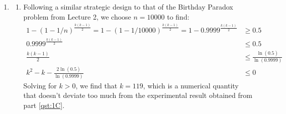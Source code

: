 \documentclass{article}
\begin{document}
\begin{enumerate}[leftmargin={*}, font={\bf}, label={\arabic*.}, ref={\arabic*}]
\begin{enumerate}[label={(\Alph*)}, ref={\theenumi(\Alph*)}]
      \item \label{qst:2C}
        For fixed values of $n = 1000$ and $m = 500$ the expected number of trials is
        $7649.81$.

      \item \label{qst:2D}
        Please refer to \autoref{lst:coupon-collector} for implementation details. A run
        with $n = 1000$ and $m = 500$ took approximately $0.0048$ seconds.
        \begin{figure}[H]
          \centering
        \end{figure}
    \end{enumerate}

  \item \label{qst:3}
    \begin{enumerate}[label={(\Alph*)}]
      \item \label{qst:3A}
        Following a similar strategic design to that of the Birthday Paradox problem from
        Lecture 2, we choose $n = 10000$ to find:
        \begin{align*}
          1 - (1 - 1/n)^{\frac{k (k - 1)}{2}} = 1 - (1 - 1/10000)^{\frac{k (k - 1)}{2}}
          = 1 - 0.9999^{\frac{k (k - 1)}{2}} &\geq 0.5 \\
          0.9999^{\frac{k (k - 1)}{2}} &\leq 0.5 \\
          \frac{k (k - 1)}{2} &\leq \frac{\ln{(0.5)}}{\ln{(0.9999)}} \\
          k^2 - k - \frac{2 \ln{(0.5)}}{\ln(0.9999)} &\leq 0
        \end{align*}
        Solving for $k > 0$, we find that $k = 119$, which is a numerical quantity that doesn't
        deviate too much from the experimental result obtained from part \ref{qst:1C}.


\end{enumerate}
\end{enumerate}
\end{document}
